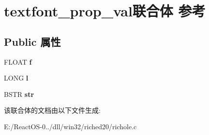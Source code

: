 \hypertarget{uniontextfont__prop__val}{}\section{textfont\+\_\+prop\+\_\+val联合体 参考}
\label{uniontextfont__prop__val}
\subsection*{Public 属性}
\begin{DoxyCompactItemize}
\item 
\mbox{\label{uniontextfont__prop__val_a02512d69dc5927acbb440f67a8ba5f8c}} 
F\+L\+O\+AT {\bfseries f}
\item 
\mbox{\label{uniontextfont__prop__val_ad7591c75f3d2e69d0afa6d9e78bdcc62}} 
L\+O\+NG {\bfseries l}
\item 
\mbox{\label{uniontextfont__prop__val_a0f935b20d7cd8cc8c0cf7ac982748da1}} 
B\+S\+TR {\bfseries str}
\end{DoxyCompactItemize}


该联合体的文档由以下文件生成\+:\begin{DoxyCompactItemize}
\item 
E\+:/\+React\+O\+S-\/0../dll/win32/riched20/richole.\+c\end{DoxyCompactItemize}
